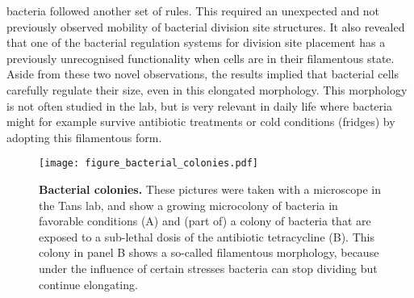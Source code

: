 bacteria followed another set of rules.
%
This required an unexpected and not previously observed mobility 
of bacterial division site structures.
It also revealed that 
one of the bacterial regulation systems for division site placement
has a previously unrecognised functionality when cells are in their filamentous state.
%
Aside from these two novel observations, 
the results implied that bacterial cells carefully regulate their size,
even in this elongated morphology.
%
This morphology is not often studied in the lab, 
but is very relevant in daily life where bacteria might for example survive antibiotic treatments or cold conditions (fridges) by adopting this filamentous form.
%

\begin{figure}
    \begin{minipage}[c]{0.5\textwidth}
        \texttt{[image: figure\_bacterial\_colonies.pdf]}
    \end{minipage}\hfill
    \begin{minipage}[c]{0.5\textwidth}
        \caption{ 
            \textbf{Bacterial colonies.}
            These pictures were taken with a microscope in the Tans lab, and show a growing microcolony of bacteria in favorable conditions (A) and (part of) a colony of bacteria that are exposed to a sub-lethal dosis of the antibiotic tetracycline (B). This colony in panel B shows a so-called filamentous morphology, because under the influence of certain stresses bacteria can stop dividing but continue elongating. 
        }
        \label{fig:intro:bacs}
    \end{minipage}
\end{figure}



